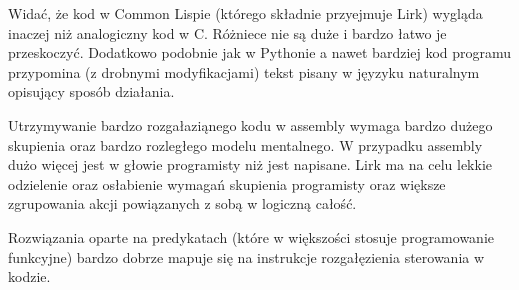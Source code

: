 \documentclass[11pt]{article}
\begin{document}
Widać, że kod w Common Lispie (którego składnie przyejmuje Lirk) wygląda inaczej niż analogiczny kod w C. Różniece nie są duże i bardzo łatwo je przeskoczyć. Dodatkowo podobnie jak w Pythonie a nawet bardziej kod programu przypomina (z drobnymi modyfikacjami) tekst pisany w jęyzyku naturalnym opisujący sposób działania. 

Utrzymywanie bardzo rozgałaziąnego kodu w assembly wymaga bardzo dużego skupienia oraz bardzo rozległego modelu mentalnego. W przypadku assembly dużo więcej jest w głowie programisty niż jest napisane.
Lirk ma na celu lekkie odzielenie oraz osłabienie wymagań skupienia programisty oraz większe zgrupowania akcji powiązanych z sobą w logiczną całość.

Rozwiązania oparte na predykatach (które w większości stosuje programowanie funkcyjne) bardzo dobrze mapuje się na instrukcje rozgałęzienia sterowania w kodzie.  
\end{document}
